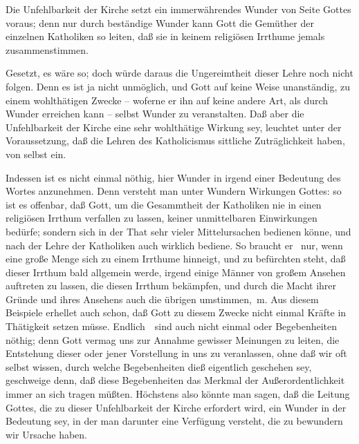  Die Unfehlbarkeit der Kirche setzt ein immerwährendes Wunder von Seite Gottes voraus; denn nur durch beständige Wunder kann Gott die Gemüther der einzelnen Katholiken so leiten, daß sie in keinem religiösen Irrthume jemals zusammenstimmen.\par
{} 
\begin{aufza}
\item Gesetzt, es wäre so; doch würde daraus die Ungereimtheit dieser Lehre noch nicht folgen. Denn es ist ja nicht unmöglich, und Gott auf keine Weise unanständig, zu einem wohlthätigen Zwecke -- woferne er ihn auf keine andere Art, als durch Wunder erreichen kann -- selbst Wunder zu veranstalten. Daß aber die Unfehlbarkeit der Kirche eine sehr wohlthätige Wirkung sey, leuchtet unter der Voraussetzung, daß die Lehren des Katholicismus sittliche Zuträglichkeit haben, von selbst ein.
\item Indessen ist es nicht einmal nöthig, hier Wunder in irgend einer Bedeutung des Wortes anzunehmen. Denn versteht man unter Wundern  Wirkungen Gottes: so ist es offenbar, daß Gott, um die Gesammtheit der Katholiken nie in einen religiösen Irrthum verfallen zu lassen, keiner unmittelbaren Einwirkungen bedürfe; sondern sich in der That sehr vieler Mittelursachen bedienen könne, und nach der Lehre der Katholiken auch wirklich bediene. So braucht er \zB\ nur, wenn eine große Menge sich zu einem Irrthume hinneigt, und zu befürchten steht, daß dieser Irrthum bald allgemein werde, irgend einige Männer von großem Ansehen auftreten zu lassen, die diesen Irrthum bekämpfen, und durch die Macht ihrer Gründe und ihres Ansehens auch die übrigen umstimmen, \udgl\,m. Aus diesem Beispiele erhellet auch schon, daß Gott zu diesem Zwecke nicht einmal  Kräfte in Thätigkeit setzen müsse. Endlich~\ sind auch nicht einmal  oder  Begebenheiten nöthig; denn Gott vermag uns zur Annahme gewisser Meinungen zu leiten, die Entstehung dieser oder jener Vorstellung in uns zu veranlassen, ohne daß wir oft selbst wissen, durch welche Begebenheiten dieß eigentlich geschehen sey, geschweige denn, daß diese Begebenheiten das Merkmal der Außerordentlichkeit immer an sich tragen müßten. Höchstens also könnte man sagen, daß die Leitung Gottes, die zu dieser Unfehlbarkeit der Kirche erfordert wird, ein Wunder in der Bedeutung sey, in der man darunter eine Verfügung versteht, die zu bewundern wir Ursache haben.
\end{aufza}


